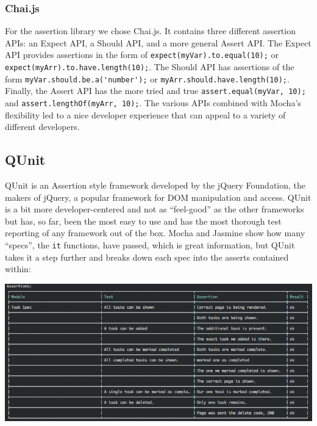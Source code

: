 \documentclass[12pt]{ucthesis}
\newenvironment{Figure}
  {\par\medskip\noindent\minipage{\linewidth}}
  {\endminipage\par\medskip}
\begin{document}
\subsubsection{Chai.js}
For the assertion library we chose Chai.js\cite{Chaijs}. It contains three different assertion APIs: an Expect API, a Should API, and a more general Assert API. The Expect API provides assertions in the form of \lstinline{expect(myVar).to.equal(10);} or \lstinline{expect(myArr).to.have.length(10);}. The Should API has assertions of the form \lstinline{myVar.should.be.a('number');} or \lstinline{myArr.should.have.length(10);}. Finally, the Assert API has the more tried and true \lstinline{assert.equal(myVar, 10);} and \lstinline{assert.lengthOf(myArr, 10);}. The various APIs combined with Mocha's flexibility led to a nice developer experience that can appeal to a variety of different developers.


\subsection{QUnit}
QUnit\cite{QUnit} is an Assertion style framework developed by the jQuery Foundation, the makers of jQuery, a popular framework for DOM manipulation and access\cite{jQuery}. QUnit is a bit more developer-centered and not as ``feel-good'' as the other frameworks but has, so far, been the most easy to use and has the most thorough test reporting of any framework out of the box. Mocha and Jasmine show how many ``specs'', the \lstinline{it} functions, have passed, which is great information, but QUnit takes it a step further and breaks down each spec into the asserts contained within:
\begin{Figure}
  \centering
  \includegraphics[width=\linewidth]{qunitrunner.png}
\end{Figure}
\end{document}
